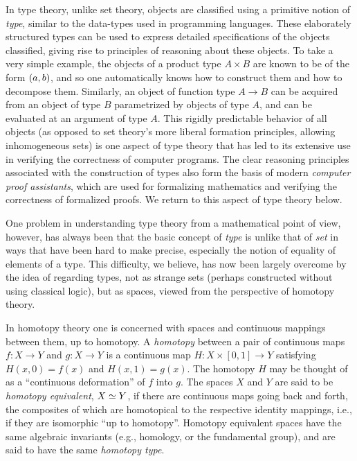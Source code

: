 In type theory, unlike set theory, objects are classified using a primitive notion of \emph{type}, similar to the data-types used in programming languages.  These elaborately structured types can be used to express detailed specifications of the objects classified, giving rise to principles of reasoning about these objects.  To take a very simple example, the objects of a product type $A\times B$ are known to be of the form ${\mathopen{}(a,b)\mathclose{}}$, and so one automatically knows how to construct them and how to decompose them. Similarly, an object of function type $A\to B$ can be acquired from an object of type $B$ parametrized by objects of type $A$, and can be evaluated at an argument of type $A$.  This rigidly predictable behavior of all objects (as opposed to set theory's more liberal formation principles, allowing inhomogeneous sets) is one aspect of type theory that has led to its extensive use in verifying the correctness of computer programs.  The clear reasoning principles associated with the construction of types also form the basis of modern \emph{computer proof assistants},%
%
which are used for formalizing mathematics and verifying the correctness of formalized proofs.  We return to this aspect of type theory below.  

One problem in understanding type theory from a mathematical point of view, however, has always been that the basic concept of \emph{type} is unlike that of \emph{set} in ways that have been hard to make precise, especially the notion of equality of elements of a type.  This difficulty, we believe, has now been largely overcome by the idea of regarding types, not as strange sets (perhaps constructed without using classical logic), but as spaces, viewed from the perspective of homotopy theory. 

In homotopy theory one is concerned with spaces and continuous mappings between them, 
%
up to homotopy.  A \emph{homotopy}
%
between a pair of continuous maps $f : X \to Y$
and  $g : X\to Y$ is 
a continuous map $H : X \times [0, 1] \to Y$ satisfying
$H(x, 0) = f (x)$  and $H(x, 1) = g(x)$. The homotopy $H$ may be thought of as a ``continuous deformation'' of $f$ into $g$. The spaces $X$ and $Y$ are said to be \emph{homotopy equivalent}, $X \simeq Y$, if there are continuous maps going back and forth, the composites of which are homotopical to the respective identity mappings, i.e., if they are isomorphic ``up to homotopy''.  Homotopy equivalent spaces have the same algebraic invariants (e.g., homology, or the fundamental group), and are said to have the same \emph{homotopy type}.

